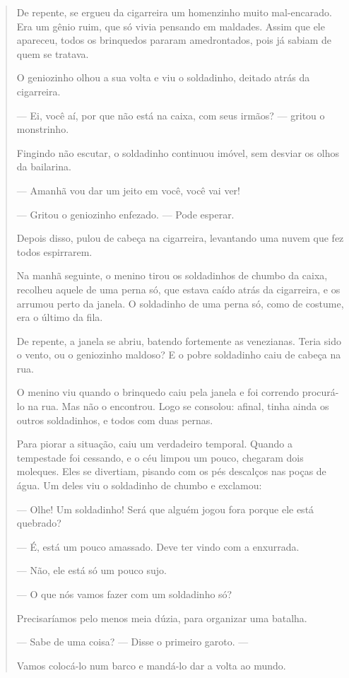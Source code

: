 \begin{escolha}
\begin{escolha}
{\begin{escolha}
\begin{quote}
De repente, se ergueu da cigarreira um homenzinho muito mal-encarado.
Era um gênio ruim, que só vivia pensando em maldades. Assim que ele
apareceu, todos os brinquedos pararam amedrontados, pois já sabiam de
quem se tratava.

O geniozinho olhou a sua volta e viu o soldadinho, deitado atrás da
cigarreira.

--- Ei, você aí, por que não está na caixa, com seus irmãos? --- gritou
o monstrinho.

Fingindo não escutar, o soldadinho continuou imóvel, sem desviar os
olhos da bailarina.

--- Amanhã vou dar um jeito em você, você vai ver!

--- Gritou o geniozinho enfezado. --- Pode esperar.

Depois disso, pulou de cabeça na cigarreira, levantando uma nuvem que
fez todos espirrarem.

Na manhã seguinte, o menino tirou os soldadinhos de chumbo da caixa,
recolheu aquele de uma perna só, que estava caído atrás da cigarreira, e
os arrumou perto da janela. O soldadinho de uma perna só, como de
costume, era o último da fila.

De repente, a janela se abriu, batendo fortemente as venezianas. Teria
sido o vento, ou o geniozinho maldoso? E o pobre soldadinho caiu de
cabeça na rua.

O menino viu quando o brinquedo caiu pela janela e foi correndo
procurá-lo na rua. Mas não o encontrou. Logo se consolou: afinal, tinha
ainda os outros soldadinhos, e todos com duas pernas.

Para piorar a situação, caiu um verdadeiro temporal. Quando a tempestade
foi cessando, e o céu limpou um pouco, chegaram dois moleques. Eles se
divertiam, pisando com os pés descalços nas poças de água. Um deles viu
o soldadinho de chumbo e exclamou:

--- Olhe! Um soldadinho! Será que alguém jogou fora porque ele está
quebrado?

--- É, está um pouco amassado. Deve ter vindo com a enxurrada.

--- Não, ele está só um pouco sujo.

--- O que nós vamos fazer com um soldadinho só?

Precisaríamos pelo menos meia dúzia, para organizar uma batalha.

--- Sabe de uma coisa? --- Disse o primeiro garoto. ---

Vamos colocá-lo num barco e mandá-lo dar a volta ao mundo.


\end{quote}
\end{escolha}}
\end{escolha}
\end{escolha}
